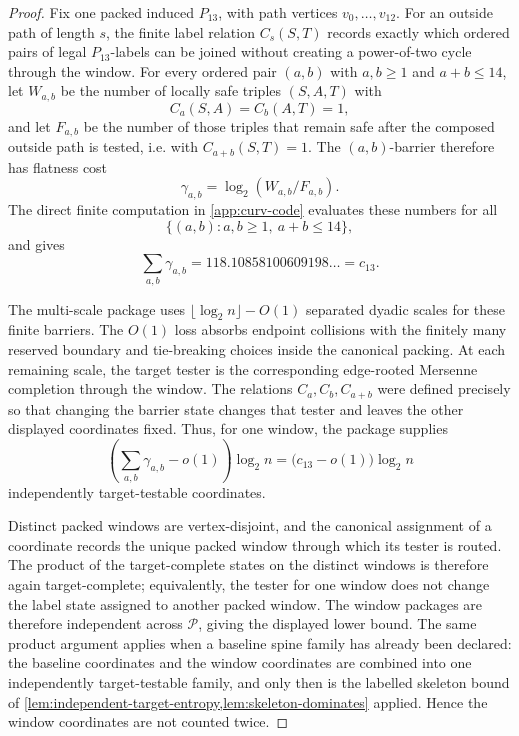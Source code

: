 \documentclass[11pt]{article}
\begin{document}
\begin{proof}
Fix one packed induced \(P_{13}\), with path vertices \(v_0,\ldots,v_{12}\).
For an outside path of length \(s\), the finite label relation \(C_s(S,T)\)
records exactly which ordered pairs of legal \(P_{13}\)-labels can be joined
without creating a power-of-two cycle through the window.  For every ordered pair
\((a,b)\) with \(a,b\ge1\) and \(a+b\le14\), let \(W_{a,b}\) be the number of
locally safe triples \((S,A,T)\) with
\[
C_a(S,A)=C_b(A,T)=1,
\]
and let \(F_{a,b}\) be the number of those triples that remain safe after the
composed outside path is tested, i.e. with \(C_{a+b}(S,T)=1\).  The
\((a,b)\)-barrier therefore has flatness cost
\[
\gamma_{a,b}=\log_2(W_{a,b}/F_{a,b}).
\]
The direct finite computation in \cref{app:curv-code} evaluates these numbers
for all
\[
\{(a,b):a,b\ge1,\ a+b\le14\},
\]
and gives
\[
\sum_{a,b}\gamma_{a,b}=118.10858100609198\ldots=c_{13}.
\]

The multi-scale package uses \(\lfloor\log_2 n\rfloor-O(1)\) separated dyadic
scales for these finite barriers.  The \(O(1)\) loss absorbs endpoint
collisions with the finitely many reserved boundary and tie-breaking choices
inside the canonical packing.  At each remaining scale, the target tester is
the corresponding edge-rooted Mersenne completion through the window.  The
relations \(C_a,C_b,C_{a+b}\) were defined precisely so that changing the
barrier state changes that tester and leaves the other displayed coordinates
fixed.  Thus, for one window, the package supplies
\[
\left(\sum_{a,b}\gamma_{a,b}-o(1)\right)\log_2 n
=
\bigl(c_{13}-o(1)\bigr)\log_2 n
\]
independently target-testable coordinates.

Distinct packed windows are vertex-disjoint, and the canonical assignment of a
coordinate records the unique packed window through which its tester is routed.
The product of the target-complete states on the distinct windows is therefore
again target-complete; equivalently, the tester for one window does not change
the label state assigned to another packed window.  The window packages are
therefore independent across \(\mathcal P\), giving the displayed lower bound.
The same product argument applies when a baseline spine family has already been
declared: the baseline coordinates and the window coordinates are combined into
one independently target-testable family, and only then is the labelled
skeleton bound of \cref{lem:independent-target-entropy,lem:skeleton-dominates}
applied.  Hence the window coordinates are not counted twice.
\end{proof}
\end{document}
